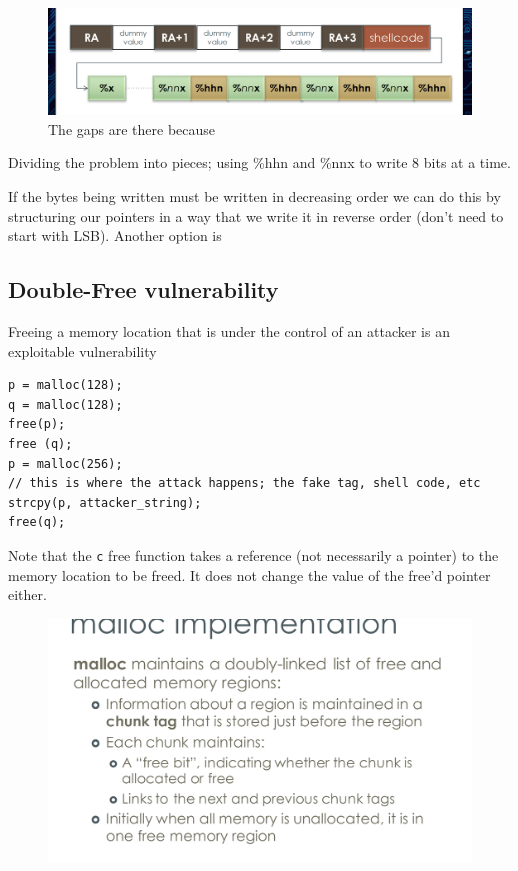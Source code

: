 \documentclass[../notes.tex]{subfiles}
\begin{document}
\begin{figure}[H]
    \centering
    \includegraphics[width=0.8\linewidth]{img/image_2023-01-16-19-48-17.png}
    \caption{The gaps are there because }
\end{figure}
Dividing the problem into pieces; using \%hhn and \%nnx to write 8 bits at a time. 

If the bytes being written must be written in decreasing order we can do this by structuring our pointers in a way that we write it in reverse order (don't need to start with LSB). Another option is 



\subsection{Double-Free vulnerability}

Freeing a memory location that is under the control of an attacker is an exploitable vulnerability


\begin{listing}[H]
\begin{verbatim}
p = malloc(128);
q = malloc(128);
free(p);
free (q);
p = malloc(256);
// this is where the attack happens; the fake tag, shell code, etc
strcpy(p, attacker_string);
free(q);
\end{verbatim}
\end{listing}

Note that the \texttt{c} free function takes a reference (not necessarily a pointer) to the memory location to be freed. It does not change the value of the free'd pointer either.

\begin{figure}[H]
    \centering
    \includegraphics[width=0.8\linewidth]{img/image_2023-01-16-20-08-50.png}
\end{figure}
\end{document}
